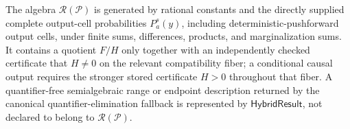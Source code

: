 The algebra \(\mathscr R(\mathcal P)\) is generated by rational constants and the directly supplied complete output-cell probabilities \(P_a^s(y)\), including deterministic-pushforward output cells, under finite sums, differences, products, and marginalization sums.  It contains a quotient \(F/H\) only together with an independently checked certificate that \(H\ne0\) on the relevant compatibility fiber; a conditional causal output requires the stronger stored certificate \(H>0\) throughout that fiber.  A quantifier-free semialgebraic range or endpoint description returned by the canonical quantifier-elimination fallback is represented by \(\mathsf{HybridResult}\), not declared to belong to \(\mathscr R(\mathcal P)\).